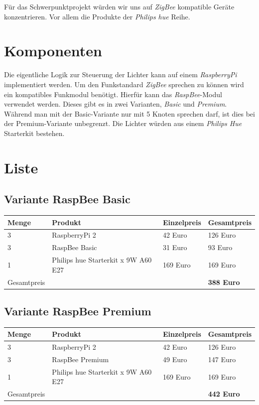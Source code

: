 \documentclass[a4paper,12pt]{article}
\begin{document}
Für das Schwerpunktprojekt würden wir uns auf \textit{ZigBee} kompatible Geräte
konzentrieren. Vor allem die Produkte der \textit{Philips hue} Reihe.

\section{Komponenten}

Die eigentliche Logik zur Steuerung der Lichter kann auf einem \textit{RaspberryPi}
implementiert werden. Um den Funkstandard \textit{ZigBee} sprechen zu können wird ein
kompatibles Funkmodul benötigt. Hierfür kann das \textit{RaspBee}-Modul verwendet werden.
Dieses gibt es in zwei Varianten, \textit{Basic} und \textit{Premium}. Während man mit der
Basic-Variante nur mit 5 Knoten sprechen darf, ist dies bei der Premium-Variante
unbegrenzt. Die Lichter würden aus einem \textit{Philips Hue} Starterkit bestehen.

\section{Liste}

\subsection{Variante RaspBee Basic}

\begin{tabular}{p{2cm}p{4.5cm}p{3cm}p{3cm}}
   Menge & Produkt & Einzelpreis & Gesamtpreis\\
   \hline
   3 & RaspberryPi 2 & 42 Euro & 126 Euro\\
   3 & RaspBee Basic & 31 Euro & 93 Euro\\
   1 & Philips hue Starterkit \newline 3 x 9W A60 E27 & 169 Euro & 169 Euro\\
   \hline
   Gesamtpreis & & & \textbf{388 Euro}\\
\end{tabular}

\subsection{Variante RaspBee Premium}

\begin{tabular}{p{2cm}p{4.5cm}p{3cm}p{3cm}}
   Menge & Produkt & Einzelpreis & Gesamtpreis\\
   \hline
   3 & RaspberryPi 2 & 42 Euro & 126 Euro\\
   3 & RaspBee Premium & 49 Euro & 147 Euro\\
   1 & Philips hue Starterkit \newline 3 x 9W A60 E27 & 169 Euro & 169 Euro\\
   \hline
   Gesamtpreis & & & \textbf{442 Euro}\\
\end{tabular}
\end{document}
